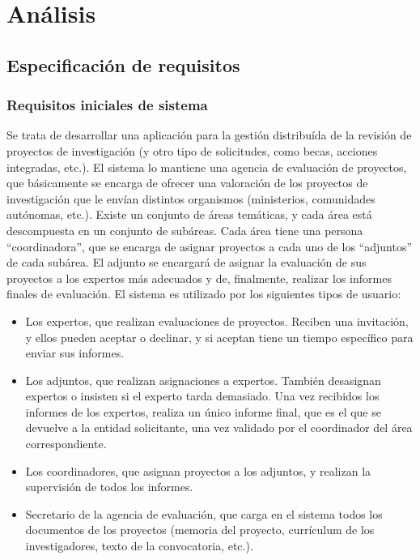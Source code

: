 \documentclass[12pt,a4paper,spanish,twoside]{book}
\begin{document}
\part{Análisis}
\chapter{Especificación de requisitos}
\section{Requisitos iniciales de sistema}
Se trata de desarrollar una aplicación para la gestión distribuída de la
revisión de proyectos de investigación (y otro tipo de solicitudes, como
becas, acciones integradas, etc.). El sistema lo mantiene una agencia de
evaluación de proyectos, que básicamente se encarga de ofrecer una valoración
de los proyectos de investigación que le envían distintos organismos
(ministerios, comunidades autónomas, etc.). Existe un conjunto de áreas
temáticas, y cada área está descompuesta en un conjunto de subáreas. Cada
área tiene una persona ``coordinadora'', que se encarga de asignar proyectos
a cada uno de los ``adjuntos'' de cada subárea. El adjunto se encargará de
asignar la evaluación de sus proyectos a los expertos más adecuados y de,
finalmente, realizar los informes finales de evaluación. El sistema es
utilizado por los siguientes tipos de usuario: 

\begin{itemize}
\item Los expertos, que realizan evaluaciones de proyectos. Reciben una 
  invitación, y ellos pueden aceptar o declinar, y si aceptan tiene un tiempo 
  específico para enviar sus informes. 
\item Los adjuntos, que realizan asignaciones a expertos. También desasignan
  expertos o insisten si el experto tarda demasiado. Una vez recibidos los 
  informes de los expertos, realiza un único informe final, que es el que se 
  devuelve a la entidad solicitante, una vez validado por el coordinador del 
  área correspondiente. 
\item Los coordinadores, que asignan proyectos a los adjuntos, y realizan la
  supervisión de todos los informes.
\item Secretario de la agencia de evaluación, que carga en el sistema todos
  los documentos de los proyectos (memoria del proyecto, currículum de los
  investigadores, texto de la convocatoria, etc.). 
\end{itemize}
\end{document}
